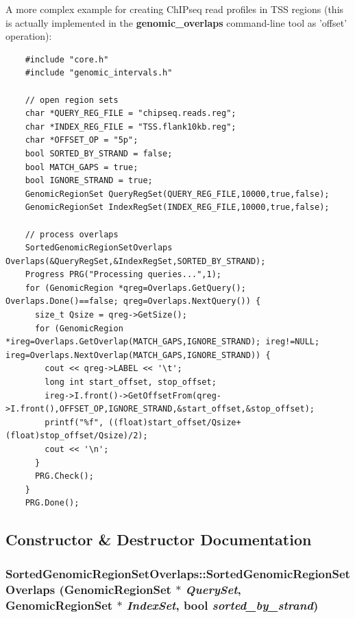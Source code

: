  A more complex example for creating ChIPseq read profiles in TSS regions (this is actually implemented in the {\bf genomic\_\-overlaps} command-line tool as 'offset' operation): 

\begin{Code}\begin{verbatim}    #include "core.h"
    #include "genomic_intervals.h"
 
    // open region sets
    char *QUERY_REG_FILE = "chipseq.reads.reg";
    char *INDEX_REG_FILE = "TSS.flank10kb.reg";
    char *OFFSET_OP = "5p";
    bool SORTED_BY_STRAND = false; 
    bool MATCH_GAPS = true;
    bool IGNORE_STRAND = true;
    GenomicRegionSet QueryRegSet(QUERY_REG_FILE,10000,true,false);
    GenomicRegionSet IndexRegSet(INDEX_REG_FILE,10000,true,false);

    // process overlaps
    SortedGenomicRegionSetOverlaps Overlaps(&QueryRegSet,&IndexRegSet,SORTED_BY_STRAND);
    Progress PRG("Processing queries...",1);
    for (GenomicRegion *qreg=Overlaps.GetQuery(); Overlaps.Done()==false; qreg=Overlaps.NextQuery()) {
      size_t Qsize = qreg->GetSize();
      for (GenomicRegion *ireg=Overlaps.GetOverlap(MATCH_GAPS,IGNORE_STRAND); ireg!=NULL; ireg=Overlaps.NextOverlap(MATCH_GAPS,IGNORE_STRAND)) {
        cout << qreg->LABEL << '\t';
        long int start_offset, stop_offset;
        ireg->I.front()->GetOffsetFrom(qreg->I.front(),OFFSET_OP,IGNORE_STRAND,&start_offset,&stop_offset);
        printf("%f", ((float)start_offset/Qsize+(float)stop_offset/Qsize)/2); 
        cout << '\n';
      }
      PRG.Check();
    }
    PRG.Done();
\end{verbatim}
\end{Code}

 

\subsection{Constructor \& Destructor Documentation}
\hypertarget{classSortedGenomicRegionSetOverlaps_0213f6ea908db759f63cea80db4909aa}{
\subsubsection[SortedGenomicRegionSetOverlaps]{\setlength{\rightskip}{0pt plus 5cm}SortedGenomicRegionSetOverlaps::SortedGenomicRegionSetOverlaps ({\bf GenomicRegionSet} $\ast$ {\em QuerySet}, \/  {\bf GenomicRegionSet} $\ast$ {\em IndexSet}, \/  bool {\em sorted\_\-by\_\-strand})}}
\label{classSortedGenomicRegionSetOverlaps_0213f6ea908db759f63cea80db4909aa}


